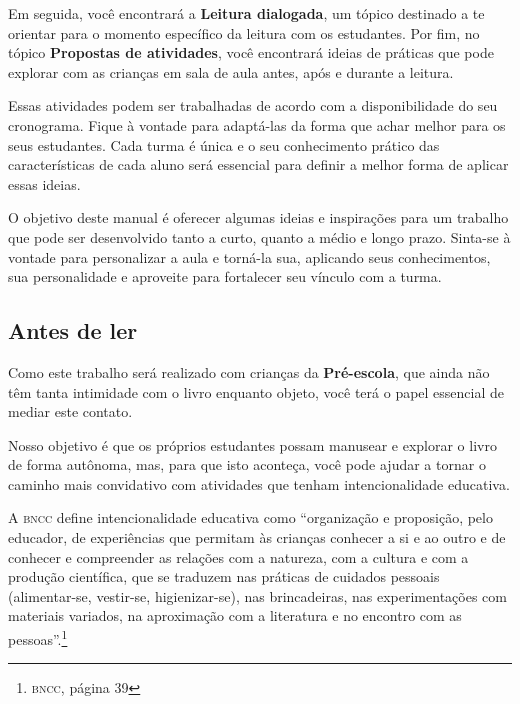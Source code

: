 \documentclass[11pt]{extarticle}
\begin{document}
Em seguida, você encontrará a \textbf{Leitura dialogada}, um 
tópico destinado a te orientar para o momento específico da 
leitura com os estudantes. Por fim, no tópico 
\textbf{Propostas de atividades}, você encontrará ideias 
de práticas que pode explorar com as crianças em sala de 
aula antes, após e durante a leitura. 

Essas atividades podem ser trabalhadas de acordo com a 
disponibilidade do seu cronograma. Fique à vontade para adaptá-las 
da forma que achar melhor para os seus estudantes. Cada turma é única 
e o seu conhecimento prático das características de cada aluno será 
essencial para definir a melhor forma de aplicar essas ideias. 

O objetivo deste manual é oferecer algumas ideias 
e inspirações para um trabalho que pode ser desenvolvido tanto 
a curto, quanto a médio e longo prazo. Sinta-se à vontade para 
personalizar a aula e torná-la sua, aplicando seus conhecimentos, sua 
personalidade e aproveite para fortalecer 
seu vínculo com a turma.


\subsection{Antes de ler}


Como este trabalho será realizado com crianças da \textbf{Pré-escola}, 
que ainda não têm tanta intimidade com o livro enquanto objeto, você terá o 
papel essencial de mediar este contato. 

Nosso objetivo é que os próprios estudantes possam manusear 
e explorar o livro de forma autônoma, mas, para que isto aconteça, você 
pode ajudar a tornar o caminho mais convidativo com atividades que tenham 
intencionalidade educativa. 

A \textsc{bncc} define intencionalidade educativa como ``organização 
e proposição, pelo educador, de experiências que permitam às crianças 
conhecer a si e ao outro e de conhecer e compreender as relações com a 
natureza, com a cultura e com a produção científica, que se traduzem nas 
práticas de cuidados pessoais (alimentar-se, vestir-se, higienizar-se), 
nas brincadeiras, nas experimentações com materiais 
variados, na aproximação com a literatura e no encontro com as 
pessoas''.\footnote{\textsc{bncc}, página 39}
\end{document}
